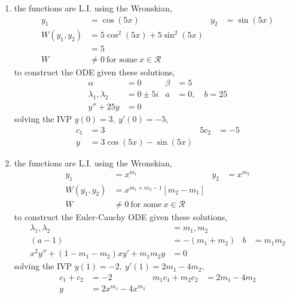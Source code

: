 \begin{enumerate}
    \item the functions are L.I. using the Wronskian,
          \begin{align}
              y_{1}           & = \cos(5x)                                 & y_{2} & = \sin(5x) \\
              W(y_{1}, y_{2}) & = 5\cos^{2}(5x) + 5\sin^{2}(5x)                                 \\
                              & = 5                                                             \\
              W               & \neq 0\ \text{for some}\ x \in \mathcal{R}
          \end{align}
          to construct the ODE given these solutions,
          \begin{align}
              \alpha                   & = 0        & \beta & = 5               \\
              \lambda_{1}, \lambda_{2} & = 0 \pm 5i & a     & = 0, \quad b = 25 \\
              y'' + 25y                & = 0
          \end{align}
          solving the IVP $ y(0) = 3,\ y'(0) = -5 $,
          \begin{align}
              c_{1} & = 3                    & 5c_{2} & = -5 \\
              y     & = 3\cos(5x) - \sin(5x)
          \end{align}

    \item the functions are L.I. using the Wronskian,
          \begin{align}
              y_{1}           & = x^{m_{1}}                                & y_{2} & = x^{m_{2}} \\
              W(y_{1}, y_{2}) & = x^{m_{1} + m_{2} - 1}[m_{2} - m_{1}]                           \\
              W               & \neq 0\ \text{for some}\ x \in \mathcal{R}
          \end{align}
          to construct the Euler-Cauchy ODE given these solutions,
          \begin{align}
              \lambda_{1}, \lambda_{2}                        & = m_{1}, m_{2}                        \\
              (a-1)                                           & = -(m_{1} + m_{2}) & b & = m_{1}m_{2} \\
              x^{2}y'' + (1 - m_{1} - m_{2})xy' + m_{1}m_{2}y & = 0
          \end{align}
          solving the IVP $ y(1) = -2,\ y'(1) = 2m_{1} - 4m_{2} $,
          \begin{align}
              c_{1} + c_{2} & = -2                      & m_{1}c_{1} + m_{2}c_{2} & = 2m_{1} - 4m_{2} \\
              y             & = 2x^{m_{1}} -4 x^{m_{2}}
          \end{align}


\end{enumerate}
